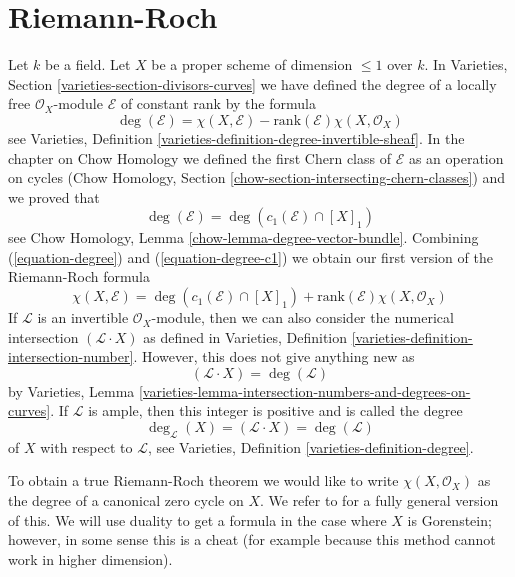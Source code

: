 \documentclass{stacks-project}
\theoremstyle{plain}
\theoremstyle{definition}
\theoremstyle{remark}
\numberwithin{equation}{subsection}
\begin{document}
\section{Riemann-Roch}
\label{section-Riemann-Roch}

\noindent
Let $k$ be a field. Let $X$ be a proper scheme of dimension $\leq 1$
over $k$. In Varieties, Section \ref{varieties-section-divisors-curves}
we have defined the degree of a locally free $\mathcal{O}_X$-module
$\mathcal{E}$ of constant rank by the formula
\begin{equation}
\label{equation-degree}
\deg(\mathcal{E}) =
\chi(X, \mathcal{E}) - \text{rank}(\mathcal{E})\chi(X, \mathcal{O}_X)
\end{equation}
see Varieties, Definition \ref{varieties-definition-degree-invertible-sheaf}.
In the chapter on Chow Homology we defined the first Chern class of
$\mathcal{E}$ as an operation on cycles
(Chow Homology, Section
\ref{chow-section-intersecting-chern-classes}) and we proved that
\begin{equation}
\label{equation-degree-c1}
\deg(\mathcal{E}) = \deg(c_1(\mathcal{E}) \cap [X]_1)
\end{equation}
see Chow Homology, Lemma \ref{chow-lemma-degree-vector-bundle}.
Combining (\ref{equation-degree}) and (\ref{equation-degree-c1})
we obtain our first version of the Riemann-Roch formula
\begin{equation}
\label{equation-rr}
\chi(X, \mathcal{E}) =
\deg(c_1(\mathcal{E}) \cap [X]_1) +
\text{rank}(\mathcal{E})\chi(X, \mathcal{O}_X)
\end{equation}
If $\mathcal{L}$ is an invertible $\mathcal{O}_X$-module, then
we can also consider the numerical intersection
$(\mathcal{L} \cdot X)$ as defined in
Varieties, Definition \ref{varieties-definition-intersection-number}.
However, this does not give anything new as
\begin{equation}
\label{equation-numerical-degree}
(\mathcal{L} \cdot X) = \deg(\mathcal{L})
\end{equation}
by Varieties, Lemma
\ref{varieties-lemma-intersection-numbers-and-degrees-on-curves}. If
$\mathcal{L}$ is ample, then this integer is positive and is
called the degree
\begin{equation}
\label{equation-degree-X}
\deg_\mathcal{L}(X) = (\mathcal{L} \cdot X) = \deg(\mathcal{L})
\end{equation}
of $X$ with respect to $\mathcal{L}$, see
Varieties, Definition \ref{varieties-definition-degree}.

\medskip\noindent
To obtain a true Riemann-Roch theorem we would like to write
$\chi(X, \mathcal{O}_X)$ as the degree of a canonical zero cycle on $X$.
We refer to \cite{F} for a fully general version of this. We will use
duality to get a formula in the case where $X$ is Gorenstein; however,
in some sense this is a cheat (for example because this method cannot
work in higher dimension).
\end{document}
